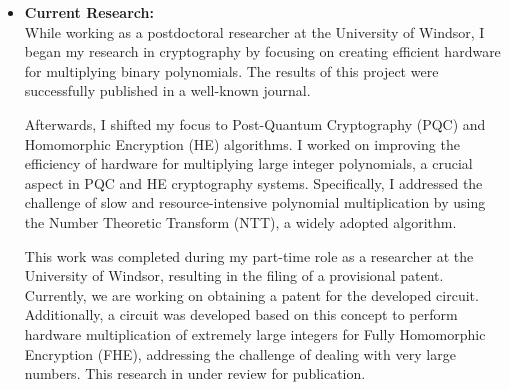 \begin {itemize}
\begin{itemize}
      \item [-] Phase 4, Verification and Testing: This phase aims to test the designed hardware and verify the functionality. The patterns are encrypted using He algorithms and would serve as inputs to test the HE based NN inference engine. The obtained accuracy should be closed to the accuracy obtained from the hardware. 
            \item [-] Phase 5, Real-world Application: Explore methods to seamlessly integrate the designed hardware accelerator into existing neural network applications. Address compatibility issues and provide adaptation guidelines to facilitate widespread adoption.
     \end{itemize}
 \item [$\bullet$] { \bf Current Research:} \vspace{0.5em} \\
While working as a postdoctoral researcher at the University of Windsor, I began my research in cryptography by focusing on creating efficient hardware for multiplying binary polynomials. The results of this project were successfully published in a well-known journal.

Afterwards, I shifted my focus to Post-Quantum Cryptography (PQC) and Homomorphic Encryption (HE) algorithms. I worked on improving the efficiency of hardware for multiplying large integer polynomials, a crucial aspect in PQC and HE cryptography systems. Specifically, I addressed the challenge of slow and resource-intensive polynomial multiplication by using the Number Theoretic Transform (NTT), a widely adopted algorithm.

This work was completed during my part-time role as a researcher at the University of Windsor, resulting in the filing of a provisional patent. Currently, we are working on obtaining a patent for the developed circuit. Additionally, a circuit was developed based on this concept to perform hardware multiplication of extremely large integers for Fully Homomorphic Encryption (FHE), addressing the challenge of dealing with very large numbers. This research in under review for publication. 


\end{itemize}
